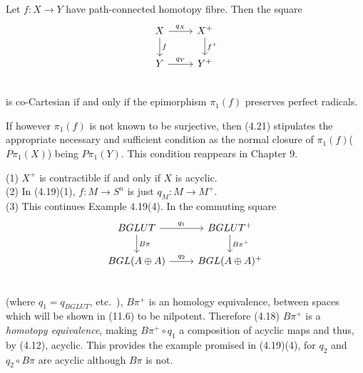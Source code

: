 \begin{prop}\label{5.11}
 	Let $f\colon   X\longrightarrow Y$ have path-connected homotopy fibre. Then the square 
\[
 \begin{tikzcd}
 X \arrow{d}{f} \arrow{r}{q_X}  & X^+ \arrow{d}{f^+}\\
 Y \arrow{r}{q_Y} &  Y^+\\
 \end{tikzcd}
 \]
is co-Cartesian if and only if the epimorphism $\pi_1(f)$ preserves perfect radicals.
 \end{prop} 

If however $\pi_1(f)$ is not known to be surjective, then (4.21) stipulates the appropriate necessary and sufficient condition as the normal closure of $\pi_1(f)$($P\pi_1(X)$) being $P\pi_1(Y)$. This condition reappears in Chapter 9.

\begin{ex}
	(1) $X^+$ is contractible if and only if $X$ is acyclic. \\
 (2) In (4.19)(1), $f\colon   M\longrightarrow S^n$ is just $q_M \colon   M\longrightarrow M^+.$ \\
(3) This continues Example 4.19(4). In the commuting square
\[
 \begin{tikzcd}
 BGLUT \arrow{d}{B\pi} \arrow{r}{q_1}  & BGLUT^+ \arrow{d}{B\pi^+}\\
 BGL(A\oplus A) \arrow{r}{q_2} &  BGL(A\oplus A)^+\\
 \end{tikzcd}
 \]
(where $q_1= q_{BGLUT}$, etc.\ ), $B\pi^+$ is an homology equivalence, between spaces which will be shown in (11.6) to be nilpotent. Therefore (4.18) $B\pi^+$ is a {\em homotopy equivalence}, making $B\pi^+ \circ q_1$ a composition of acyclic maps and thus, by (4.12), acyclic. This provides the example promised in
(4.19)(4), for $q_2$ and $q_2\circ B\pi$ are acyclic although $B\pi$ is not.
\end{ex}

